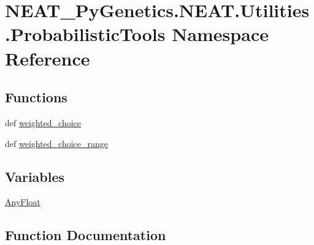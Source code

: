 \hypertarget{namespaceNEAT__PyGenetics_1_1NEAT_1_1Utilities_1_1ProbabilisticTools}{}\section{N\+E\+A\+T\+\_\+\+Py\+Genetics.\+N\+E\+A\+T.\+Utilities.\+Probabilistic\+Tools Namespace Reference}
\label{namespaceNEAT__PyGenetics_1_1NEAT_1_1Utilities_1_1ProbabilisticTools}
\subsection*{Functions}
\begin{DoxyCompactItemize}
\item 
def \hyperlink{namespaceNEAT__PyGenetics_1_1NEAT_1_1Utilities_1_1ProbabilisticTools_a221f1f7b971343a6b94683e937f85161}{weighted\+\_\+choice}
\item 
def \hyperlink{namespaceNEAT__PyGenetics_1_1NEAT_1_1Utilities_1_1ProbabilisticTools_a43b159877aba0fde144f159772e135f6}{weighted\+\_\+choice\+\_\+range}
\end{DoxyCompactItemize}
\subsection*{Variables}
\begin{DoxyCompactItemize}
\item 
\hyperlink{namespaceNEAT__PyGenetics_1_1NEAT_1_1Utilities_1_1ProbabilisticTools_a77fe590d9378f14206a59d8e6bdec281}{Any\+Float}
\end{DoxyCompactItemize}


\subsection{Function Documentation}
